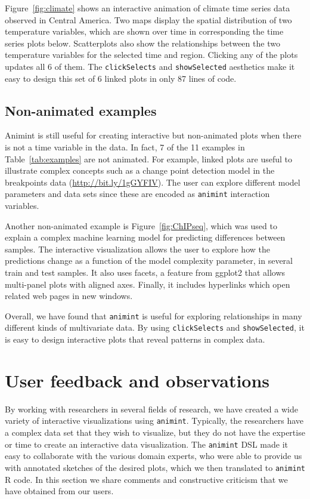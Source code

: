 \documentclass[journal]{vgtc}\usepackage[]{graphicx}\usepackage[]{color}
\begin{document}
Figure~\ref{fig:climate} shows an interactive animation of climate
time series data observed in Central America. Two maps display the
spatial distribution of two temperature variables, which are shown
over time in corresponding the time series plots below. Scatterplots
also show the relationships between the two temperature variables for
the selected time and region. Clicking any of the plots updates all 6
of them. The \texttt{clickSelects} and \texttt{showSelected} aesthetics make it easy to
design this set of 6 linked plots in only 87 lines of code.

\subsection{Non-animated examples}

Animint is still useful for creating interactive but
non-animated plots when there is not a time variable in the data.
In fact, 7 of the 11 examples in
Table~\ref{tab:examples} are not animated. For example, linked plots
are useful to illustrate complex concepts such as a change point
detection model in the breakpoints data
(\url{http://bit.ly/1gGYFIV}). The user can explore different model
parameters and data sets since these are encoded as \texttt{animint}
interaction variables.

Another non-animated example is Figure~\ref{fig:ChIPseq}, which was
used to explain a complex machine learning model for predicting
differences between samples. The interactive visualization allows the
user to explore how the predictions change as a function of the model
complexity parameter, in several train and test samples. It also uses
facets, a feature from ggplot2 that allows multi-panel plots with
aligned axes. Finally, it includes hyperlinks which open related web
pages in new windows.

Overall, we have found that \texttt{animint} is useful for exploring
relationships in many different kinds of multivariate data. By using
\texttt{clickSelects} and \texttt{showSelected}, it is easy to design
interactive plots that reveal patterns in complex data.

\section{User feedback and observations}

By working with researchers in several fields of research,
we have created a wide variety of
interactive visualizations using \texttt{animint}.
Typically, the researchers have a complex data set that
they wish to visualize,
but they do not have the expertise or time to create
an interactive data visualization.
The \texttt{animint} DSL made it easy to collaborate with the various domain experts,
who were able to provide us with annotated sketches of the desired plots,
which we then translated to \texttt{animint} R code.
In this section we share comments and
constructive criticism that we have obtained from our users.
\end{document}
